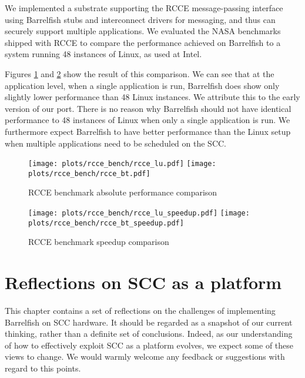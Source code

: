 \documentclass[a4paper,twoside]{report} %
\begin{document}
We implemented a substrate supporting the RCCE message-passing
interface using Barrelfish stubs and interconnect drivers for
messaging, and thus can securely support multiple applications. We
evaluated the NASA benchmarks shipped with RCCE to compare the
performance achieved on Barrelfish to a system running 48 instances of
Linux, as used at Intel.

Figures \ref{fig:appresults_total} and \ref{fig:appresults_speedup}
show the result of this comparison. We can see that at the application
level, when a single application is run, Barrelfish does show only
slightly lower performance than 48 Linux instances. We attribute this
to the early version of our port. There is no reason why Barrelfish
should not have identical performance to 48 instances of Linux when
only a single application is run. We furthermore expect Barrelfish to
have better performance than the Linux setup when multiple
applications need to be scheduled on the SCC.

\begin{figure}
  \centering
  \texttt{[image: plots/rcce\_bench/rcce\_lu.pdf]}%
  \texttt{[image: plots/rcce\_bench/rcce\_bt.pdf]}
  \caption{RCCE benchmark absolute performance comparison}
  \label{fig:appresults_total}
\end{figure}

\begin{figure}
  \centering
  \texttt{[image: plots/rcce\_bench/rcce\_lu\_speedup.pdf]}%
  \texttt{[image: plots/rcce\_bench/rcce\_bt\_speedup.pdf]}
  \caption{RCCE benchmark speedup comparison}
  \label{fig:appresults_speedup}
\end{figure}

\chapter{Reflections on SCC as a platform}\label{chap:refl}

This chapter contains a set of reflections on the challenges of
implementing Barrelfish on SCC hardware.  It should be regarded as a
snapshot of our current thinking, rather than a definite set of
conclusions.  Indeed, as our understanding of how to effectively
exploit SCC as a platform evolves, we expect some of these views to
change.  We would warmly welcome any feedback or suggestions with
regard to this points.  
\end{document}
